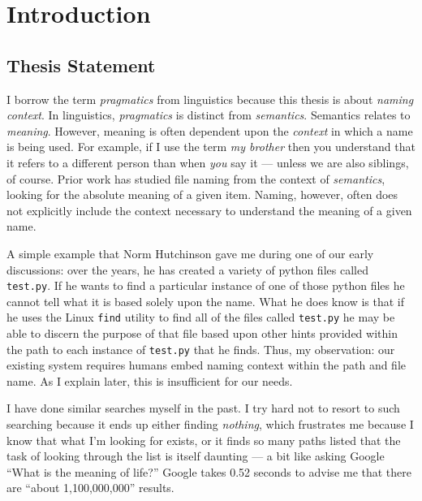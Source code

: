 
\chapter{Introduction}
\label{ch:introduction}

\section{Thesis Statement}
\label{ch:introduction:sec:thesis-statement}




I borrow the term \emph{pragmatics} from linguistics because this thesis is
about \emph{naming context}.  In linguistics, \emph{pragmatics} is distinct from
\emph{semantics}.  Semantics relates to \emph{meaning}.  However, meaning is
often dependent upon the \emph{context} in which a name is being used.  For
example, if I use the term \emph{my brother} then you understand that it refers
to a different person than when \emph{you} say it --- unless we are also
siblings, of course.  Prior work has studied file naming from the context of
\emph{semantics}, looking for the absolute meaning of a given item.  Naming,
however, often does not explicitly include the context necessary to understand
the meaning of a given name.

A simple example that Norm Hutchinson gave me during one of our early
discussions: over the years, he has created a variety of python files called
\texttt{test.py}.  If he wants to find a particular instance of one of those
python files he cannot tell what it is based solely upon the name. What he does
know is that if he uses the Linux \texttt{find} utility to find all of the files
called \texttt{test.py} he may be able to discern the purpose of that file based
upon other hints provided within the path to each instance of \texttt{test.py}
that he finds.  Thus, my observation: our existing system requires humans embed
naming context within the path and file name.  As I explain later, this is
insufficient for our needs.

I have done similar searches myself in the past.  I try hard not to resort to
such searching because it ends up either finding \emph{nothing}, which
frustrates me because I know that what I'm looking for exists, or it finds so
many paths listed that the task of looking through the list is itself daunting
--- a bit like asking Google ``What is the meaning of life?''  Google takes 0.52
seconds to advise me that there are ``about 1,100,000,000'' results.


